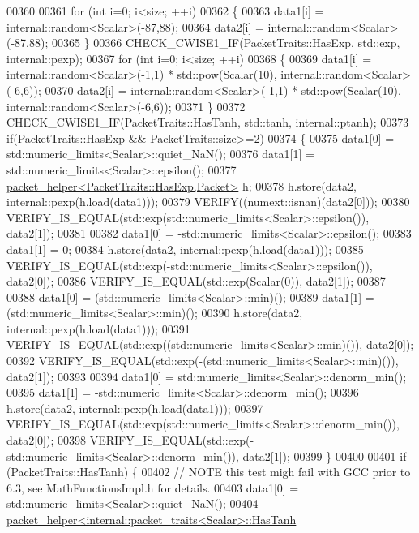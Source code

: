 \begin{DoxyCode}
00360 
00361   \textcolor{keywordflow}{for} (\textcolor{keywordtype}{int} i=0; i<size; ++i)
00362   \{
00363     data1[i] = internal::random<Scalar>(-87,88);
00364     data2[i] = internal::random<Scalar>(-87,88);
00365   \}
00366   CHECK\_CWISE1\_IF(PacketTraits::HasExp, std::exp, internal::pexp);
00367   \textcolor{keywordflow}{for} (\textcolor{keywordtype}{int} i=0; i<size; ++i)
00368   \{
00369     data1[i] = internal::random<Scalar>(-1,1) * std::pow(Scalar(10), internal::random<Scalar>(-6,6));
00370     data2[i] = internal::random<Scalar>(-1,1) * std::pow(Scalar(10), internal::random<Scalar>(-6,6));
00371   \}
00372   CHECK\_CWISE1\_IF(PacketTraits::HasTanh, std::tanh, internal::ptanh);
00373   \textcolor{keywordflow}{if}(PacketTraits::HasExp && PacketTraits::size>=2)
00374   \{
00375     data1[0] = std::numeric\_limits<Scalar>::quiet\_NaN();
00376     data1[1] = std::numeric\_limits<Scalar>::epsilon();
00377     \hyperlink{structpacket__helper}{packet\_helper<PacketTraits::HasExp,Packet>} h;
00378     h.store(data2, internal::pexp(h.load(data1)));
00379     VERIFY((numext::isnan)(data2[0]));
00380     VERIFY\_IS\_EQUAL(std::exp(std::numeric\_limits<Scalar>::epsilon()), data2[1]);
00381 
00382     data1[0] = -std::numeric\_limits<Scalar>::epsilon();
00383     data1[1] = 0;
00384     h.store(data2, internal::pexp(h.load(data1)));
00385     VERIFY\_IS\_EQUAL(std::exp(-std::numeric\_limits<Scalar>::epsilon()), data2[0]);
00386     VERIFY\_IS\_EQUAL(std::exp(Scalar(0)), data2[1]);
00387 
00388     data1[0] = (std::numeric\_limits<Scalar>::min)();
00389     data1[1] = -(std::numeric\_limits<Scalar>::min)();
00390     h.store(data2, internal::pexp(h.load(data1)));
00391     VERIFY\_IS\_EQUAL(std::exp((std::numeric\_limits<Scalar>::min)()), data2[0]);
00392     VERIFY\_IS\_EQUAL(std::exp(-(std::numeric\_limits<Scalar>::min)()), data2[1]);
00393 
00394     data1[0] = std::numeric\_limits<Scalar>::denorm\_min();
00395     data1[1] = -std::numeric\_limits<Scalar>::denorm\_min();
00396     h.store(data2, internal::pexp(h.load(data1)));
00397     VERIFY\_IS\_EQUAL(std::exp(std::numeric\_limits<Scalar>::denorm\_min()), data2[0]);
00398     VERIFY\_IS\_EQUAL(std::exp(-std::numeric\_limits<Scalar>::denorm\_min()), data2[1]);
00399   \}
00400 
00401   \textcolor{keywordflow}{if} (PacketTraits::HasTanh) \{
00402     \textcolor{comment}{// NOTE this test migh fail with GCC prior to 6.3, see MathFunctionsImpl.h for details.}
00403     data1[0] = std::numeric\_limits<Scalar>::quiet\_NaN();
00404     \hyperlink{structpacket__helper}{packet\_helper<internal::packet\_traits<Scalar>::HasTanh}

\end{DoxyCode}
